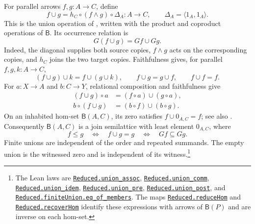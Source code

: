 \documentclass[11pt]{article}
\newcommand{\B}{\mathsf B}
\begin{document}
For parallel arrows $f,g:A\to C$, define
\[
 f\cup g=h_C\circ(f\wedge g)\circ\Delta_A:A\longrightarrow C,
 \qquad \Delta_A=\langle1_A,1_A\rangle.
\]
This is the union operation of \cite[p.~220]{DP}, written with
the product and coproduct operations of $\B$. Its occurrence
relation is
\[
 G(f\cup g)=Gf\cup Gg.
\]
Indeed, the diagonal supplies both source copies, $f\wedge g$
acts on the corresponding copies, and $h_C$ joins the two target
copies. Faithfulness gives, for parallel $f,g,k:A\to C$,
\[
 (f\cup g)\cup k=f\cup(g\cup k),\qquad
 f\cup g=g\cup f,\qquad f\cup f=f.
\]
For $a:X\to A$ and $b:C\to Y$, relational composition and
faithfulness give
\[
 \begin{aligned}
 (f\cup g)\circ a&=(f\circ a)\cup(g\circ a),\\
 b\circ(f\cup g)&=(b\circ f)\cup(b\circ g).
 \end{aligned}
\]
On an inhabited hom-set $\B(A,C)$, its zero satisfies
$f\cup0_{A,C}=f$; see also \cite[pp.~290--291]{DP}.
Consequently $\B(A,C)$ is a join semilattice with least element
$0_{A,C}$, where
\[
 f\leq g\quad\Longleftrightarrow\quad f\cup g=g
 \quad\Longleftrightarrow\quad Gf\subseteq Gg.
\]
Finite unions are independent of the order and repeated
summands. The empty union is the witnessed zero and is independent
of its witness.\footnote{\raggedright The Lean laws are
\href{https://github.com/flengyel/Dosen-Petric-Maximality/blob/5dbee39bea09539bd130f729e82636419f71f920/DosenPetric/ReducedUnion.lean\#L131}{\texttt{Reduced.\allowbreak{}union\_assoc}},
\href{https://github.com/flengyel/Dosen-Petric-Maximality/blob/5dbee39bea09539bd130f729e82636419f71f920/DosenPetric/ReducedUnion.lean\#L90}{\texttt{Reduced.\allowbreak{}union\_comm}},
\href{https://github.com/flengyel/Dosen-Petric-Maximality/blob/5dbee39bea09539bd130f729e82636419f71f920/DosenPetric/ReducedUnion.lean\#L97}{\texttt{Reduced.\allowbreak{}union\_idem}},
\href{https://github.com/flengyel/Dosen-Petric-Maximality/blob/5dbee39bea09539bd130f729e82636419f71f920/DosenPetric/ReducedUnion.lean\#L80}{\texttt{Reduced.\allowbreak{}union\_pre}},
\href{https://github.com/flengyel/Dosen-Petric-Maximality/blob/5dbee39bea09539bd130f729e82636419f71f920/DosenPetric/ReducedUnion.lean\#L85}{\texttt{Reduced.\allowbreak{}union\_post}}, and
\href{https://github.com/flengyel/Dosen-Petric-Maximality/blob/5dbee39bea09539bd130f729e82636419f71f920/DosenPetric/ReducedFiniteUnion.lean\#L57}{\texttt{Reduced.finiteUnion.\allowbreak{}eq\_of\_members}}.
The maps \href{https://github.com/flengyel/Dosen-Petric-Maximality/blob/5dbee39bea09539bd130f729e82636419f71f920/DosenPetric/ReducedQuotientReduction.lean\#L21}{\texttt{Reduced.\allowbreak{}reduceHom}} and
\href{https://github.com/flengyel/Dosen-Petric-Maximality/blob/5dbee39bea09539bd130f729e82636419f71f920/DosenPetric/ReducedRecovery.lean\#L26}{\texttt{Reduced.\allowbreak{}recoverHom}} identify these expressions
with arrows of $\B(P)$ and are inverse on each hom-set.}
\end{document}
